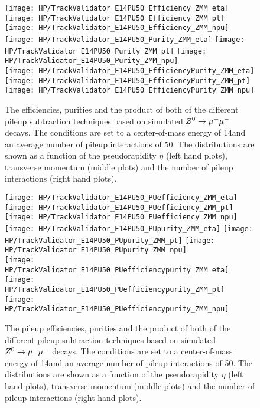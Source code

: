 \begin{figure}[!h]
  \centering
  \texttt{[image: HP/TrackValidator\_E14PU50\_Efficiency\_ZMM\_eta]}
  \texttt{[image: HP/TrackValidator\_E14PU50\_Efficiency\_ZMM\_pt]}
  \texttt{[image: HP/TrackValidator\_E14PU50\_Efficiency\_ZMM\_npu]}
   \\
  \texttt{[image: HP/TrackValidator\_E14PU50\_Purity\_ZMM\_eta]}
  \texttt{[image: HP/TrackValidator\_E14PU50\_Purity\_ZMM\_pt]}
  \texttt{[image: HP/TrackValidator\_E14PU50\_Purity\_ZMM\_npu]}
   \\
  \texttt{[image: HP/TrackValidator\_E14PU50\_EfficiencyPurity\_ZMM\_eta]}
  \texttt{[image: HP/TrackValidator\_E14PU50\_EfficiencyPurity\_ZMM\_pt]}
  \texttt{[image: HP/TrackValidator\_E14PU50\_EfficiencyPurity\_ZMM\_npu]}
  \caption[Efficiencies, purities and their product of the different pileup subtraction techniques based $\Zz\rightarrow\MM$ decays with 14\TeV and $\left<PU\right>=50$]{The efficiencies, purities and the product of both of the different pileup subtraction techniques based on simulated $\Zz\rightarrow\MM$ decays. The conditions are set to a center-of-mass energy of 14\TeV and an average number of pileup interactions of 50. The distributions are shown as a function of the pseudorapidity $\eta$ (left hand plots), transverse momentum (middle plots) and the number of pileup interactions (right hand plots).}
\end{figure}
\clearpage

\begin{figure}[!h]
  \centering
  \texttt{[image: HP/TrackValidator\_E14PU50\_PUefficiency\_ZMM\_eta]}
  \texttt{[image: HP/TrackValidator\_E14PU50\_PUefficiency\_ZMM\_pt]}
  \texttt{[image: HP/TrackValidator\_E14PU50\_PUefficiency\_ZMM\_npu]}
   \\
  \texttt{[image: HP/TrackValidator\_E14PU50\_PUpurity\_ZMM\_eta]}
  \texttt{[image: HP/TrackValidator\_E14PU50\_PUpurity\_ZMM\_pt]}
  \texttt{[image: HP/TrackValidator\_E14PU50\_PUpurity\_ZMM\_npu]}
   \\
  \texttt{[image: HP/TrackValidator\_E14PU50\_PUefficiencypurity\_ZMM\_eta]}
  \texttt{[image: HP/TrackValidator\_E14PU50\_PUefficiencypurity\_ZMM\_pt]}
  \texttt{[image: HP/TrackValidator\_E14PU50\_PUefficiencypurity\_ZMM\_npu]}
  \caption[Pileup efficiencies, purities and their product of the different pileup subtraction techniques based $\Zz\rightarrow\MM$ decays with 14\TeV and $\left<PU\right>=50$]{The pileup efficiencies, purities and the product of both of the different pileup subtraction techniques based on simulated $\Zz\rightarrow\MM$ decays. The conditions are set to a center-of-mass energy of 14\TeV and an average number of pileup interactions of 50. The distributions are shown as a function of the pseudorapidity $\eta$ (left hand plots), transverse momentum (middle plots) and the number of pileup interactions (right hand plots).}
\end{figure}
\clearpage

